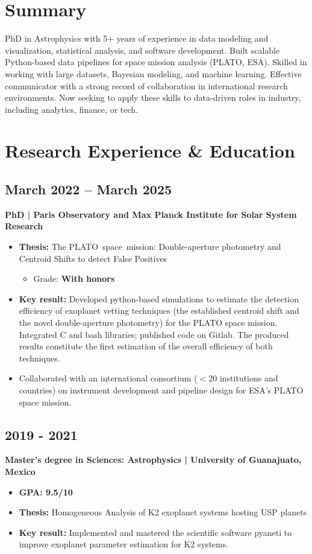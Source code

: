 \documentclass[11pt,a4paper]{article}
\begin{document}
\begin{multicols}{2}
		\section{Summary}
		PhD in Astrophysics with 5+ years of experience in data modeling and visualization, statistical analysis, and software development. Built scalable Python-based data pipelines for space mission analysis (PLATO, ESA). Skilled in working with large datasets, Bayesian modeling, and machine learning. Effective communicator with a strong record of collaboration in international research environments. Now seeking to apply these skills to data-driven roles in industry, including analytics, finance, or tech.
		
		\section{Research Experience \& Education}
		
		
		\subsection{March 2022 – March 2025}
		\textbf{PhD | Paris Observatory and Max Planck Institute for Solar System Research}
		\begin{itemize}
			\item \textbf{Thesis:} The \mbox{PLATO space mission:} Double-aperture photometry and Centroid Shifts to detect False Positives
			\begin{itemize}
				\item Grade: \textbf{With honors}
			\end{itemize}
			\item \textbf{Key result:} Developed python-based simulations to estimate the detection efficiency of exoplanet vetting techniques (the established centroid shift and the novel double-aperture photometry) for the PLATO space mission. Integrated C and bash libraries; published code on Gitlab. The produced results constitute the first estimation of the overall efficiency of both techniques.
			\item Collaborated with an international consortium ($<$20 institutions and countries) on instrument development and pipeline design for ESA's PLATO space mission.
		\end{itemize}
		
		\subsection{2019 - 2021}
		\textbf{Master's degree in Sciences: Astrophysics | University of Guanajuato, Mexico}
		\begin{itemize}
		\item \textbf{GPA: 9.5/10}
		\item \textbf{Thesis:} Homogeneous Analysis of K2 exoplanet systems hosting USP planets
		\item \textbf{Key result:} Implemented and mastered the scientific software pyaneti to improve exoplanet parameter estimation for K2 systems. 
		\end{itemize}
		

\end{multicols}
\end{document}

